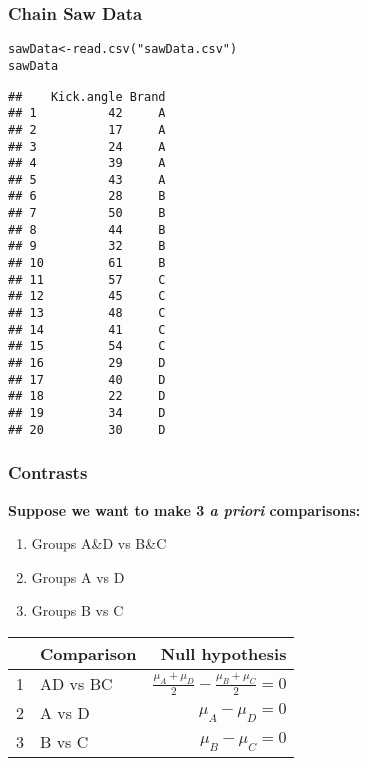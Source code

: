 \documentclass[color=usenames,dvipsnames]{beamer}\usepackage[]{graphicx}\usepackage[]{color}
\makeatletter
\newcommand{\hlstr}[1]{\textcolor[rgb]{0.749,0.012,0.012}{#1}}%
\newcommand{\hlstd}[1]{\textcolor[rgb]{0,0,0}{#1}}%
\newcommand{\hlkwb}[1]{\textcolor[rgb]{0,0.341,0.682}{#1}}%
\newcommand{\hlkwd}[1]{\textcolor[rgb]{0.004,0.004,0.506}{#1}}%
\newenvironment{kframe}{%
 \def\at@end@of@kframe{}%
 \ifinner\ifhmode%
  \def\at@end@of@kframe{\end{minipage}}%
  \begin{minipage}{\columnwidth}%
 \fi\fi%
 \def\FrameCommand##1{\hskip\@totalleftmargin \hskip-\fboxsep
 \colorbox{shadecolor}{##1}\hskip-\fboxsep
     \hskip-\linewidth \hskip-\@totalleftmargin \hskip\columnwidth}%
 \MakeFramed {\advance\hsize-\width
   \@totalleftmargin\z@ \linewidth\hsize
   \@setminipage}}%
 {\par\unskip\endMakeFramed%
 \at@end@of@kframe}
\newenvironment{knitrout}{}{} %
\makeatother
\begin{document}
\begin{frame}[fragile]
  \frametitle{Chain Saw Data}
\begin{knitrout}\scriptsize
{}\color{fgcolor}\begin{kframe}
\begin{alltt}
\hlstd{sawData} \hlkwb{<-} \hlkwd{read.csv}\hlstd{(}\hlstr{"sawData.csv"}\hlstd{)}
\hlstd{sawData}
\end{alltt}
\begin{verbatim}
##    Kick.angle Brand
## 1          42     A
## 2          17     A
## 3          24     A
## 4          39     A
## 5          43     A
## 6          28     B
## 7          50     B
## 8          44     B
## 9          32     B
## 10         61     B
## 11         57     C
## 12         45     C
## 13         48     C
## 14         41     C
## 15         54     C
## 16         29     D
## 17         40     D
## 18         22     D
## 19         34     D
## 20         30     D
\end{verbatim}
\end{kframe}
\end{knitrout}
\end{frame}






\begin{frame}[fragile]
  \frametitle{Contrasts}
  {\bf Suppose we want to make 3 {\it a priori} comparisons:}
  \begin{enumerate}[\bf (1)]
    \item Groups A\&D vs B\&C
    \item Groups A vs D
    \item Groups B vs C
  \end{enumerate}
  \pause
  \vspace{0.5cm}
  \begin{center}
    \begin{tabular}{llr}
      \hline
        & Comparison & Null hypothesis \\
      \hline
      1 & AD vs BC & $\frac{\mu_A + \mu_D}{2} - \frac{\mu_B + \mu_C}{2} = 0$ \\
      2 & A vs D & $\mu_A - \mu_D = 0$ \\
      3 & B vs C & $\mu_B - \mu_C = 0$ \\
      \hline
    \end{tabular}
  \end{center}
\end{frame}
\end{document}
